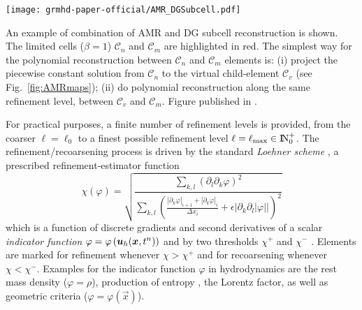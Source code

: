 \begin{marginfigure}
  \texttt{[image: grmhd-paper-official/AMR\_DGSubcell.pdf]}
  \caption[
     AMR and DG cartoon, drawn , 
    ]{An example of combination of AMR and DG subcell
    reconstruction is shown. The limited cells ($\beta=1$)
    $\mathcal{C}_n$ and $\mathcal{C}_m$ are highlighted in red. The
    simplest way for the polynomial reconstruction between
    $\mathcal{C}_n$ and $\mathcal{C}_m$ elements is: (i) project the
    piecewise constant solution from $\mathcal{C}_n$ to the virtual
    child-element $\mathcal{C}_v$ (see Fig.~\protect\ref{fig:AMRmaps}); (ii) do
    polynomial reconstruction along the same refinement level, between
    $\mathcal{C}_v$ and $\mathcal{C}_m$.
    Figure published in \cite{Fambri2017}.
    }
  \label{fig:AMR}
\end{marginfigure}

For practical purposes, a finite number of refinement levels is provided,
\ie from the coarser $\ell = \ell_0$ to a finest possible refinement
level $\ell = \ell_{\text{max}}\in{\rm I\!N}^+_0$. The
refinement/recoarsening process is driven by the standard \emph{Loehner scheme}
\cite{Loehner1987}, \ie a prescribed {re\-fine\-ment-estimator function}
\begin{equation}
\chi(\varphi) =
\sqrt{	\frac{
		\sum_{k,l} \left( \partial_l \partial_k \varphi \right)^2
		}{
		\sum_{k,l} 
		  \left(
          \frac{
			\left| \partial_k \varphi \right|_{i+1} + \left| \partial_k \varphi \right|_i
		  }{\Delta x_i}
		  + \epsilon
		  \left| \partial_k \partial_l \left| \varphi \right| \right|
		  \right)^2
		}
}
\end{equation}
which is a function of discrete gradients and second derivatives of a scalar
\emph{indicator function}
${\varphi}= \varphi\left(\boldsymbol{u}_h(\boldsymbol{x},t^n)\right)$
and by two thresholds $\chi^+$ and $\chi^-$
\cite{Loehner1987,Zanotti2015d,ADERDGVisc}. Elements are
marked for refinement whenever $\chi > \chi^+$ and for recoarsening
whenever $\chi < \chi^-$. Examples for the indicator function $\varphi$
in hydrodynamics are the rest mass density ($\varphi=\rho$), production
of entropy \cite{PS:entropy, SCR:CWENOquadtree, CS:epsweno}, the Lorentz
factor, as well as geometric criteria ($\varphi=\varphi(\vec x)$).

